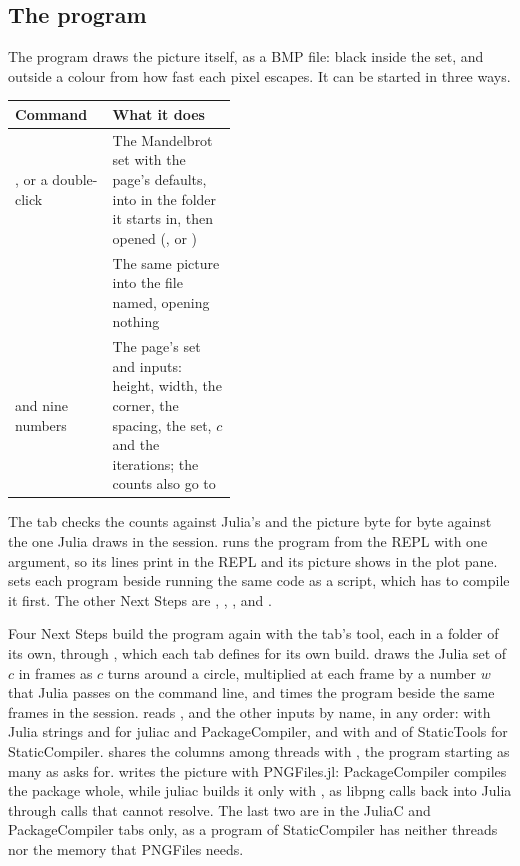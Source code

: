 \subsection{The program}
The program draws the picture itself, as a BMP file: black inside the set, and outside a colour from how fast each
pixel escapes. It can be started in three ways.
\begin{center}\small
\renewcommand{\arraystretch}{1.2}
\begin{tabularx}{\linewidth}{@{}p{0.44\linewidth}L@{}}
\toprule
\textbf{Command} & \textbf{What it does}\\
\midrule
{}, or a double-click & The Mandelbrot set with the page's defaults, into  in the folder
  it starts in, then opened (,  or )\\
 & The same picture into the file named, opening nothing\\
 and nine numbers & The page's set and inputs: height, width, the corner, the
  spacing, the set, $c$ and the iterations; the counts also go to \\
\bottomrule
\end{tabularx}
\end{center}
The tab checks the counts against Julia's and the picture byte for byte against the one Julia draws in the session.
 runs the program from the REPL with one argument, so its lines print in the REPL and
its picture shows in the plot pane.  sets each program beside  running the same
code as a script, which has to compile it first. The other Next Steps are , , ,  and .

Four Next Steps build the program again with the tab's tool, each in a folder of its own, through
, which each tab defines for its own build.  draws the Julia set of
$c$ in frames as $c$ turns around a circle, multiplied at each frame by a number $w$ that Julia passes on the command
line, and times the program beside the same frames in the session.  reads ,
 and the other inputs by name, in any order: with Julia strings and  for juliac and
PackageCompiler, and with  and  of StaticTools for StaticCompiler.  shares the columns among threads with , the program starting as many as
 asks for.  writes the picture with PNGFiles.jl: PackageCompiler
compiles the package whole, while juliac builds it only with , as libpng calls back into Julia
through calls that  cannot resolve. The last two are in the JuliaC and PackageCompiler tabs only, as
a program of StaticCompiler has neither threads nor the memory that PNGFiles needs.

